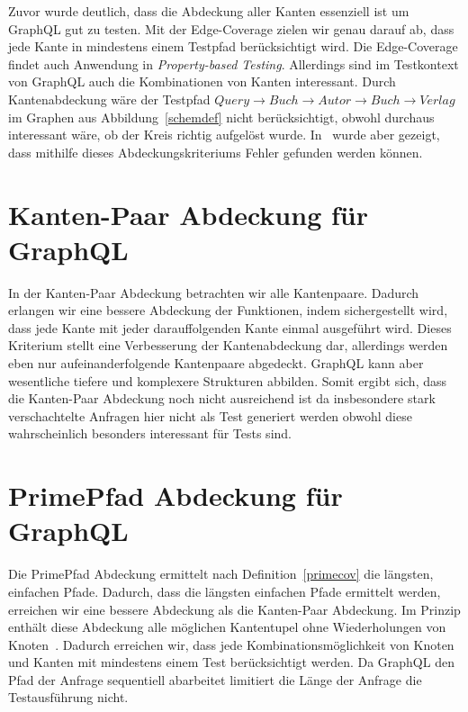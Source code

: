 Zuvor wurde deutlich, dass die Abdeckung aller Kanten essenziell ist um GraphQL gut zu testen.
Mit der Edge-Coverage zielen wir genau darauf ab, dass jede Kante in mindestens einem Testpfad berücksichtigt wird.
Die Edge-Coverage findet auch Anwendung in \textit{Property-based Testing}\cite[vgl. D-RQ1 ]{property-based-testing}.
Allerdings sind im Testkontext von GraphQL auch die Kombinationen von Kanten interessant.
Durch Kantenabdeckung wäre der Testpfad $Query \rightarrow Buch \rightarrow Autor \rightarrow Buch \rightarrow Verlag$
im Graphen aus Abbildung~\ref{schemdef} nicht berücksichtigt, obwohl durchaus interessant wäre, ob der Kreis richtig aufgelöst wurde.
In~\cite{property-based-testing} wurde aber gezeigt, dass mithilfe dieses Abdeckungskriteriums Fehler gefunden werden können.

\section{Kanten-Paar Abdeckung für GraphQL}

In der Kanten-Paar Abdeckung betrachten wir alle Kantenpaare.
Dadurch erlangen wir eine bessere Abdeckung der Funktionen, indem sichergestellt wird, dass jede Kante mit jeder darauffolgenden Kante einmal ausgeführt wird.
Dieses Kriterium stellt eine Verbesserung der Kantenabdeckung dar, allerdings werden eben nur aufeinanderfolgende Kantenpaare abgedeckt.
GraphQL kann aber wesentliche tiefere und komplexere Strukturen abbilden.
Somit ergibt sich, dass die Kanten-Paar Abdeckung noch nicht ausreichend ist da insbesondere stark verschachtelte Anfragen
hier nicht als Test generiert werden obwohl diese wahrscheinlich besonders interessant für Tests sind.

\section{PrimePfad Abdeckung für GraphQL}

Die PrimePfad Abdeckung ermittelt nach Definition~\ref{primecov} die längsten, einfachen Pfade.
Dadurch, dass die längsten einfachen Pfade ermittelt werden, erreichen wir eine bessere Abdeckung als die Kanten-Paar Abdeckung.
Im Prinzip enthält diese Abdeckung alle möglichen Kantentupel ohne Wiederholungen von Knoten~\cite[vgl. S. 42]{software-testing}.
Dadurch erreichen wir, dass jede Kombinationsmöglichkeit von Knoten und Kanten mit mindestens einem Test berücksichtigt werden.
Da GraphQL den Pfad der Anfrage sequentiell abarbeitet limitiert die Länge der Anfrage die Testausführung nicht.

